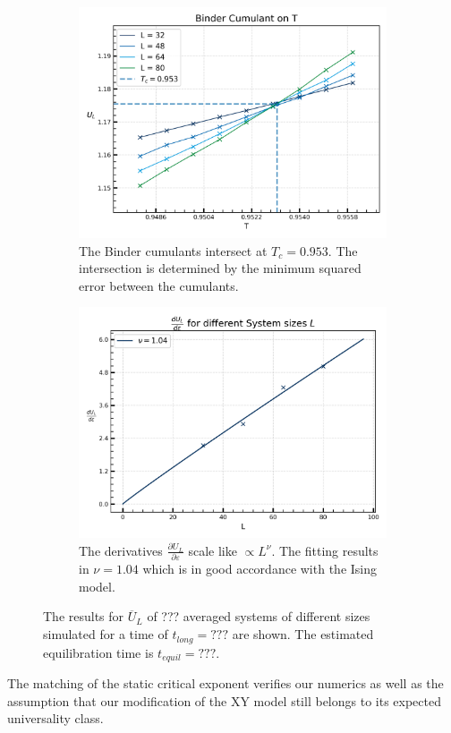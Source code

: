 			\begin{figure}[htp]
				\begin{subfigure}{0.5\textwidth}
					\centering
					\includegraphics[width=0.8\linewidth]{graphics/cum_time_avg.png}
					\caption{The Binder cumulants intersect at $T_c =	0.953$. The intersection is determined by the minimum squared error between the cumulants.}
				\end{subfigure}
				\begin{subfigure}{0.5\textwidth}
					\centering
					\includegraphics[width=0.8\linewidth]{graphics/critical_exponent_time_avg.png}
					\caption{The derivatives $\frac{\partial U_L}{\partial \varepsilon}$ scale like $\propto L^\nu$. The fitting results in $\nu = 1.04$ which is in good accordance with the Ising model.}
				\end{subfigure}
				\caption{The results for $\overline{U}_L$ of ??? averaged systems of different sizes simulated for a time of $t_{long} =	??? $ are shown. The estimated equilibration time is $t_{equil} =	??? $.}
				\label{Fig::Binder-Cum-Result}
			\end{figure}  
		The matching of the static critical exponent verifies our numerics as well as the assumption that our modification of the XY model still belongs to its expected universality class.
